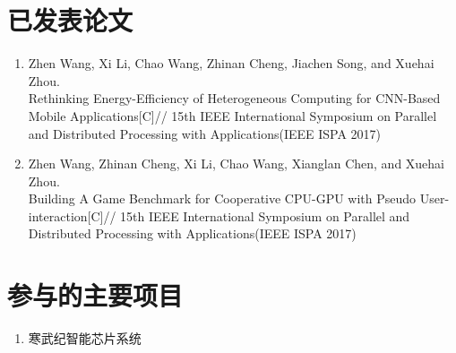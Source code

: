 \begin{publications}

\section*{已发表论文}

\begin{enumerate}
\item Zhen Wang, Xi Li, Chao Wang, Zhinan Cheng, Jiachen Song, and Xuehai Zhou.\\
Rethinking Energy-Efficiency of Heterogeneous Computing for CNN-Based Mobile Applications[C]//
15th IEEE International Symposium on Parallel and Distributed Processing with Applications(IEEE ISPA 2017)
\item Zhen Wang, Zhinan Cheng, Xi Li, Chao Wang, Xianglan Chen, and Xuehai Zhou.\\
Building A Game Benchmark for Cooperative CPU-GPU with Pseudo User-interaction[C]//
15th IEEE International Symposium on Parallel and Distributed Processing with Applications(IEEE ISPA 2017)
\end{enumerate}


\section*{参与的主要项目}
\begin{enumerate}
\item 寒武纪智能芯片系统
\end{enumerate}

\end{publications}
